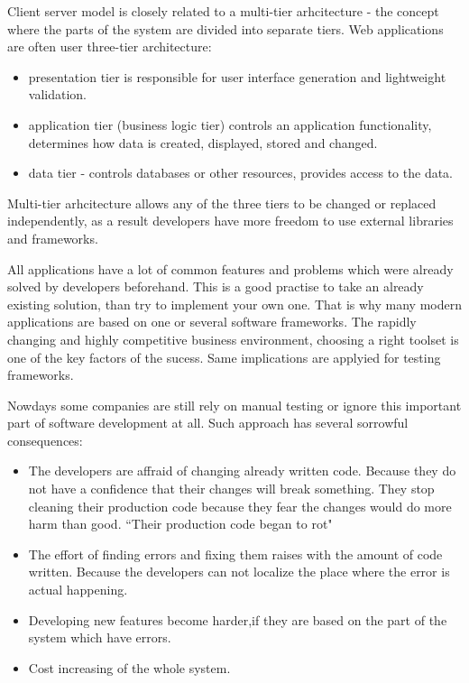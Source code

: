     	Client server model is closely related to a multi-tier arhcitecture - the concept where
    	 the parts of the system are divided into separate tiers. Web applications
    	 are often user three-tier architecture:
    	 \begin{itemize}
    	   \item presentation tier is responsible for user interface generation and
    	   lightweight validation.
    	   \item application tier (business logic tier) controls an application
    	   functionality, determines how data is created, displayed, stored and
    	   changed.
    	   \item data tier - controls databases or other resources, provides access
    	   to the data.
    	 \end{itemize}
    	Multi-tier arhcitecture allows any of the three tiers to be changed or
    	replaced independently, as a result developers have more freedom to use
    	external libraries and frameworks.
		
		All	applications have a lot of common features and problems which were already
		solved by developers beforehand. This is a good practise to take an already
		existing solution, than try to implement your own one. That is why many modern applications 
		are based on one or several software frameworks. The rapidly changing and
		highly competitive business environment, choosing a right toolset is one of the key factors of the sucess.
		Same implications are applyied for testing frameworks. 	
		
		Nowdays some companies are still rely on manual testing or ignore this
		important part of software development at all. Such approach has several
		sorrowful consequences:
		\begin{itemize}
			\item The developers are affraid of changing already written
			code. Because they do not have a confidence that their changes will break
			something. They stop cleaning their production code because they fear the
			changes would do more harm than good. ``Their production code began to rot"
			\cite[p.123]{cleanCode} 
			
			\item The effort of finding errors and	fixing them raises with the amount of code written.
			Because the developers can not localize the place where the error is actual
			happening.
			\item Developing new features become harder,if they are based on the part
			of the system which have errors.
		
			\item Cost increasing of the whole system.
	 	 \end{itemize}
	 	 
